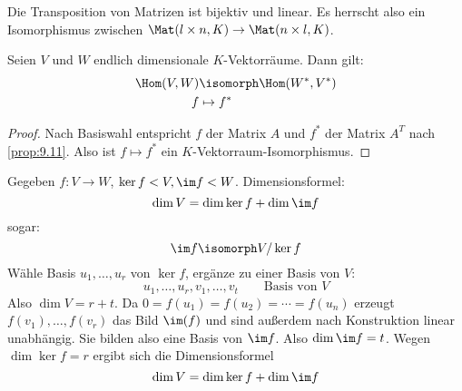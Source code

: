 \documentclass[a4paper, 10pt]{scrbook}
\begin{document}
\begin{note}
Die Transposition von Matrizen ist bijektiv und linear.
Es herrscht also ein Isomorphismus zwischen $\Mat(l\times n,K)\to \Mat(n\times l,K)$.
\end{note}

\begin{kor}
\label{kor:9.12}
Seien $V$ und $W$ endlich dimensionale $K$-Vektorräume.
Dann gilt:
\begin{align*}
\Hom(V,W)&\isomorph \Hom(W^*,V^*)\\
\qquad\qquad f&\mapsto f^*
\end{align*}
\begin{proof}
Nach Basiswahl entspricht $f$ der Matrix $A$ und $f^*$ der Matrix $A^T$ nach \ref{prop:9.11}.
Also ist $f\mapsto f^*$ ein $K$-Vektorraum-Isomorphismus.
\end{proof}

\begin{note}
Gegeben $f:V\to W$, $\ker f <V, \im f <W$.
Dimensionsformel:
\[
	\dim V = \dim \ker f + \dim \im f
\]
sogar:
\[
\im f \isomorph V/\ker f
\]
Wähle Basis $u_1,\dotsc,u_r$ von $\ker f$, ergänze zu einer Basis von $V$:
\[
u_1,\dotsc,u_r,v_1,\dotsc,v_t \qquad \text{Basis von $V$}
\]
Also $\dim V=r+t$.
Da $0=f(u_1)=f(u_2)=\dotsb=f(u_n)$ erzeugt $f(v_1),\dotsc,f(v_r)$ das Bild $\im(f)$ und sind außerdem nach Konstruktion linear unabhängig.
Sie bilden also eine Basis von $\im f$.
Also $\dim \im f = t$.
Wegen $\dim \ker f = r$ ergibt sich die Dimensionsformel
\[
	\dim V = \dim \ker f + \dim \im f
\]
\end{note}
\end{kor}
\end{document}
